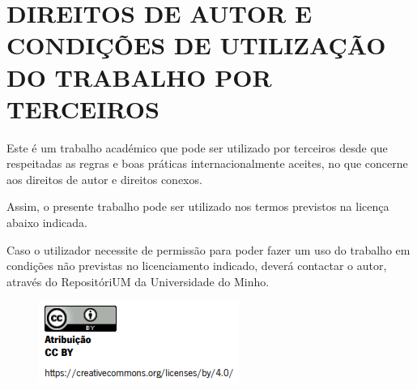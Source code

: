 \chapter*{DIREITOS DE AUTOR E CONDIÇÕES DE UTILIZAÇÃO DO TRABALHO POR TERCEIROS}

Este é um trabalho académico que pode ser utilizado por terceiros desde que respeitadas as regras e boas práticas internacionalmente aceites, no que concerne aos direitos de autor e direitos conexos.

Assim, o presente trabalho pode ser utilizado nos termos previstos na licença abaixo indicada.

Caso o utilizador necessite de permissão para poder fazer um uso do trabalho em condições não previstas
no licenciamento indicado, deverá contactar o autor, através do RepositóriUM da Universidade do Minho.

\begin{figure}[H]
    \includegraphics{img/licenca.PNG}
\end{figure}
